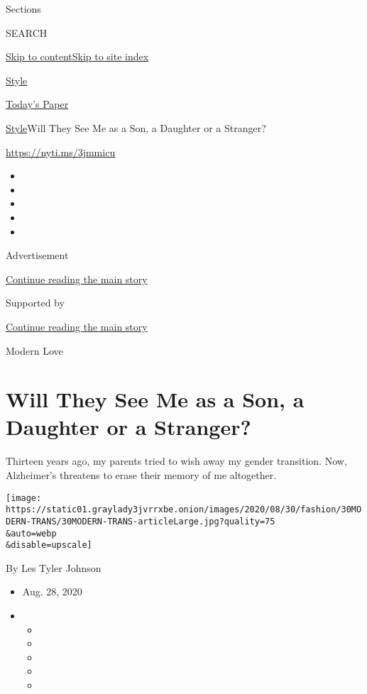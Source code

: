 Sections

SEARCH

\protect\hyperlink{site-content}{Skip to
content}\protect\hyperlink{site-index}{Skip to site index}

\href{https://www.nytimes3xbfgragh.onion/section/style}{Style}

\href{https://myaccount.nytimes3xbfgragh.onion/auth/login?response_type=cookie\&client_id=vi}{}

\href{https://www.nytimes3xbfgragh.onion/section/todayspaper}{Today's
Paper}

\href{/section/style}{Style}\textbar{}Will They See Me as a Son, a
Daughter or a Stranger?

\url{https://nyti.ms/3jmmicu}

\begin{itemize}
\item
\item
\item
\item
\item
\end{itemize}

Advertisement

\protect\hyperlink{after-top}{Continue reading the main story}

Supported by

\protect\hyperlink{after-sponsor}{Continue reading the main story}

Modern Love

\hypertarget{will-they-see-me-as-a-son-a-daughter-or-a-stranger}{%
\section{Will They See Me as a Son, a Daughter or a
Stranger?}\label{will-they-see-me-as-a-son-a-daughter-or-a-stranger}}

Thirteen years ago, my parents tried to wish away my gender transition.
Now, Alzheimer's threatens to erase their memory of me altogether.

\texttt{[image: https://static01.graylady3jvrrxbe.onion/images/2020/08/30/fashion/30MODERN-TRANS/30MODERN-TRANS-articleLarge.jpg?quality=75\\\&auto=webp\\\&disable=upscale]}

By Les Tyler Johnson

\begin{itemize}
\item
  Aug. 28, 2020
\item
  \begin{itemize}
  \item
  \item
  \item
  \item
  \item
  \end{itemize}
\end{itemize}

